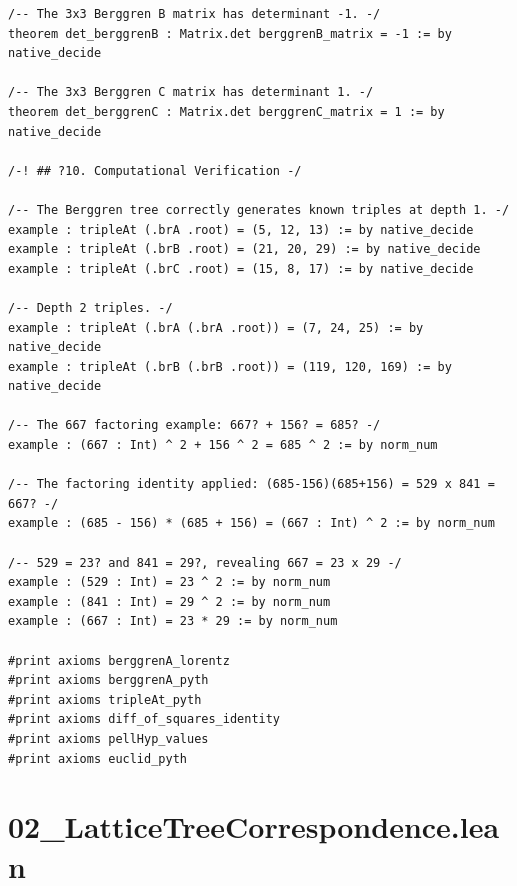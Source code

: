 \documentclass[11pt,twoside,openright]{book}
\theoremstyle{definition}
\theoremstyle{remark}
\begin{document}
\begin{lstlisting}[style=lean]
/-- The 3x3 Berggren B matrix has determinant -1. -/
theorem det_berggrenB : Matrix.det berggrenB_matrix = -1 := by native_decide

/-- The 3x3 Berggren C matrix has determinant 1. -/
theorem det_berggrenC : Matrix.det berggrenC_matrix = 1 := by native_decide

/-! ## ?10. Computational Verification -/

/-- The Berggren tree correctly generates known triples at depth 1. -/
example : tripleAt (.brA .root) = (5, 12, 13) := by native_decide
example : tripleAt (.brB .root) = (21, 20, 29) := by native_decide
example : tripleAt (.brC .root) = (15, 8, 17) := by native_decide

/-- Depth 2 triples. -/
example : tripleAt (.brA (.brA .root)) = (7, 24, 25) := by native_decide
example : tripleAt (.brB (.brB .root)) = (119, 120, 169) := by native_decide

/-- The 667 factoring example: 667? + 156? = 685? -/
example : (667 : Int) ^ 2 + 156 ^ 2 = 685 ^ 2 := by norm_num

/-- The factoring identity applied: (685-156)(685+156) = 529 x 841 = 667? -/
example : (685 - 156) * (685 + 156) = (667 : Int) ^ 2 := by norm_num

/-- 529 = 23? and 841 = 29?, revealing 667 = 23 x 29 -/
example : (529 : Int) = 23 ^ 2 := by norm_num
example : (841 : Int) = 29 ^ 2 := by norm_num
example : (667 : Int) = 23 * 29 := by norm_num

#print axioms berggrenA_lorentz
#print axioms berggrenA_pyth
#print axioms tripleAt_pyth
#print axioms diff_of_squares_identity
#print axioms pellHyp_values
#print axioms euclid_pyth

\end{lstlisting}

\clearpage

\section*{02\_LatticeTreeCorrespondence.lean}
\end{document}
